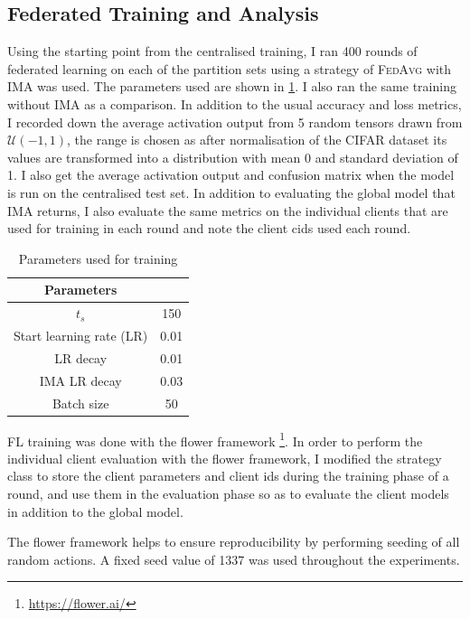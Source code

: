 \documentclass{article}
\newcommand*{\fedavg}{\textsc{FedAvg}}
\begin{document}
\subsection{Federated Training and Analysis}
Using the starting point from the centralised training, I ran 400 rounds of federated learning on each of the partition sets using a strategy of \fedavg{} with IMA was used. The parameters used are shown in \cref{tbl:params}. I also ran the same training without IMA as a comparison. In addition to the usual accuracy and loss metrics, I recorded down the average activation output from 5 random tensors drawn from $\mathcal{U}(-1,1)$, the range is chosen as after normalisation of the CIFAR dataset its values are transformed into a distribution with mean 0 and standard deviation of 1. I also get the average activation output and confusion matrix when the model is run on the centralised test set. In addition to evaluating the global model that IMA returns, I also evaluate the same metrics on the individual clients that are used for training in each round and note the client cids used each round.

\begin{table}
  \centering
  \begin{tabular}{cc}
    \hline
    Parameters                      \\
    \hline
    $t_s$                    & 150  \\
    Start learning rate (LR) & 0.01 \\
    LR decay                 & 0.01 \\
    IMA LR decay             & 0.03 \\
    Batch size               & 50   \\
    \hline
  \end{tabular}
  \caption{Parameters used for training}
  \label{tbl:params}
\end{table}

FL training was done with the flower framework \footnote{\url{https://flower.ai/}}. In order to perform the individual client evaluation with the flower framework, I modified the strategy class to store the client parameters and client ids during the training phase of a round, and use them in the evaluation phase so as to evaluate the client models in addition to the global model.

The flower framework helps to ensure reproducibility by performing seeding of all random actions. A fixed seed value of 1337 was used throughout the experiments.
\end{document}
